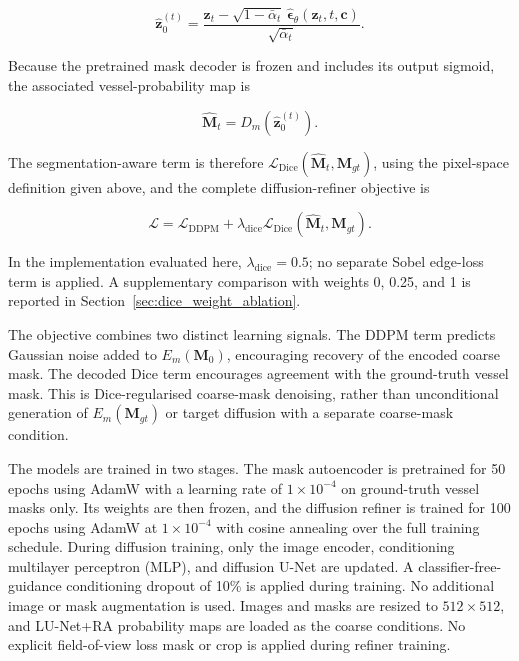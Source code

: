 \documentclass[jimaging,article,submit,pdftex,moreauthors]{Definitions/mdpi}%
\begin{document}
\begin{equation}
\hat{\mathbf{z}}_0^{(t)}=
\frac{\mathbf{z}_t-
\sqrt{1-\bar{\alpha}_t}\,
\hat{\boldsymbol{\epsilon}}_\theta(\mathbf{z}_t,t,\mathbf{c})}
{\sqrt{\bar{\alpha}_t}}.
\end{equation}

Because the pretrained mask decoder is frozen and includes its output sigmoid, the associated vessel-probability map is

\begin{equation}
\hat{\mathbf{M}}_t=D_m\!\left(\hat{\mathbf{z}}_0^{(t)}\right).
\end{equation}

The segmentation-aware term is therefore $\mathcal{L}_{\text{Dice}}(\hat{\mathbf{M}}_t,\mathbf{M}_{gt})$, using the pixel-space definition given above, and the complete diffusion-refiner objective is

\begin{equation}
\mathcal{L}=
\mathcal{L}_{\text{DDPM}}+
\lambda_{\text{dice}}
\mathcal{L}_{\text{Dice}}(\hat{\mathbf{M}}_t,\mathbf{M}_{gt}).
\end{equation}

In the implementation evaluated here, $\lambda_{\text{dice}}=0.5$; no separate Sobel edge-loss term is applied. A supplementary comparison with weights 0, 0.25, and 1 is reported in Section~\ref{sec:dice_weight_ablation}.



The objective combines two distinct learning signals. The DDPM term predicts Gaussian noise added to $E_m(\mathbf{M}_0)$, encouraging recovery of the encoded coarse mask. The decoded Dice term encourages agreement with the ground-truth vessel mask. This is Dice-regularised coarse-mask denoising, rather than unconditional generation of $E_m(\mathbf{M}_{gt})$ or target diffusion with a separate coarse-mask condition.



The models are trained in two stages. The mask autoencoder is pretrained for 50 epochs using AdamW with a learning rate of $1\times10^{-4}$ on ground-truth vessel masks only. Its weights are then frozen, and the diffusion refiner is trained for 100 epochs using AdamW at $1\times10^{-4}$ with cosine annealing over the full training schedule. During diffusion training, only the image encoder, conditioning multilayer perceptron (MLP), and diffusion U-Net are updated. A classifier-free-guidance conditioning dropout of 10\% is applied during training. No additional image or mask augmentation is used. Images and masks are resized to $512\times512$, and LU-Net+RA probability maps are loaded as the coarse conditions. No explicit field-of-view loss mask or crop is applied during refiner training.
\end{document}
